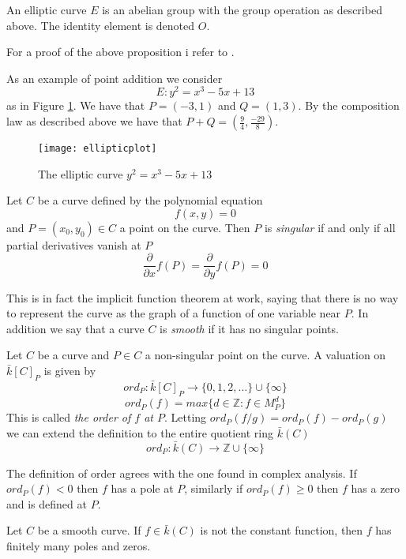 \begin{prop}
  An elliptic curve $E$ is an abelian group with the group operation as described above.
The identity element is denoted $O$.
\end{prop}
For a proof of the above proposition i refer to \cite{AEC}.

\begin{ex}
 As an example of point addition we consider
$$E: y^2 = x^3-5x+13$$
as in Figure \ref{fig1}. We have that $P=(-3,1)$ and $Q=(1,3)$. By the composition law
as described above we have that $P+Q=(\frac{9}{4}, \frac{-29}{8})$.
\end{ex}



\begin{figure}\label{fig1}
 \caption{The elliptic curve $y^2=x^3-5x+13$}
  \centering
  \texttt{[image: ellipticplot]}
\end{figure}

\begin{mydef}
 Let $C$ be a curve defined by the polynomial equation
$$f(x,y) = 0$$
and $P=(x_0,y_0) \in C$ a point on the curve. Then $P$ is \emph{singular} if and only if all
partial derivatives vanish at $P$
$$\frac{\partial}{\partial x}f(P) = \frac{\partial}{\partial y}f(P) = 0$$
\end{mydef}

This is in fact the implicit function theorem at work, saying that there is no way to
represent the curve as the graph of a function of one variable near $P$.
In addition we say that a curve $C$ is \emph{smooth} if it has no singular points.

\begin{mydef}
 Let $C$ be a curve and $P\in C$ a non-singular point on the curve. A valuation on
$\bar{k}[C]_P$ is given by
$$ ord_P : \bar{k}[C]_P \rightarrow \{ 0, 1, 2, \ldots \} \cup \{ \infty \} $$
$$ ord_P(f) = max \{ d\in \mathbb{Z} : f\in M_P^d \} $$
This is called \emph{the order of $f$ at $P$}.
Letting $ord_P(f/g) = ord_P(f) - ord_P(g)$ we can extend the definition to the entire
quotient ring $\bar{k}(C)$
$$ ord_P: \bar{k}(C) \rightarrow \mathbb{Z}\cup \{\infty \} $$
\end{mydef}

The definition of order agrees with the one found in complex analysis.
If $ord_P(f) < 0$ then $f$ has a pole at $P$, similarly if $ord_P(f) \ge 0$ then $f$ 
has a zero and is defined at $P$.

\begin{prop}
 Let $C$ be a smooth curve. If $f\in \bar{k}(C)$ is not the constant function, then
$f$ has finitely many poles and zeros.
\label{prop:1}
\end{prop}

